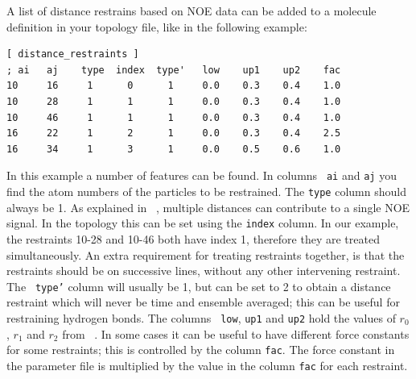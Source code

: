 A list of distance restrains based on NOE data can be added to a molecule
definition in your topology file, like in the following example:
\begin{verbatim}
[ distance_restraints ]
; ai   aj    type  index  type'   low    up1    up2    fac
10     16     1      0      1     0.0    0.3    0.4    1.0 
10     28     1      1      1     0.0    0.3    0.4    1.0 
10     46     1      1      1     0.0    0.3    0.4    1.0 
16     22     1      2      1     0.0    0.3    0.4    2.5 
16     34     1      3      1     0.0    0.5    0.6    1.0 
\end{verbatim}
In this example a number of features can be found.  In columns {\tt
ai} and {\tt aj} you find the atom numbers of the particles to be
restrained. The {\tt type} column should always be 1.  As explained in
~, multiple distances can contribute to a single NOE
signal. In the topology this can be set using the {\tt index}
column. In our example, the restraints 10-28 and 10-46 both have index
1, therefore they are treated simultaneously.  An extra requirement
for treating restraints together, is that the restraints should be on
successive lines, without any other intervening restraint.  The {\tt
type'} column will usually be 1, but can be set to 2 to obtain a
distance restraint which will never be time and ensemble averaged;
this can be useful for restraining hydrogen bonds.  The columns {\tt
low}, {\tt up1} and {\tt up2} hold the values of $r_0$, $r_1$ and
$r_2$ from ~.  In some cases it can be useful to have
different force constants for some restraints; this is controlled by
the column {\tt fac}.  The force constant in the parameter file is
multiplied by the value in the column {\tt fac} for each restraint.

